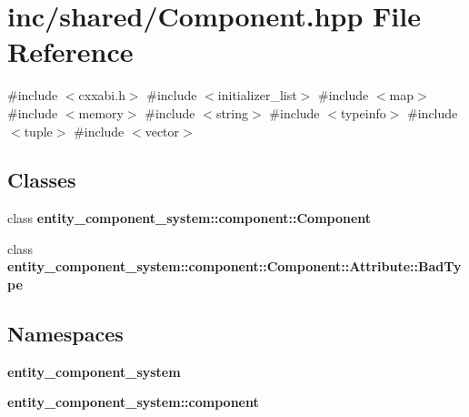\section{inc/shared/\+Component.hpp File Reference}
\label{_component_8hpp}
{\ttfamily \#include $<$cxxabi.\+h$>$}\newline
{\ttfamily \#include $<$initializer\+\_\+list$>$}\newline
{\ttfamily \#include $<$map$>$}\newline
{\ttfamily \#include $<$memory$>$}\newline
{\ttfamily \#include $<$string$>$}\newline
{\ttfamily \#include $<$typeinfo$>$}\newline
{\ttfamily \#include $<$tuple$>$}\newline
{\ttfamily \#include $<$vector$>$}\newline
\subsection*{Classes}
\begin{DoxyCompactItemize}
\item 
class {\bf entity\+\_\+component\+\_\+system\+::component\+::\+Component}
\item 
class {\bf entity\+\_\+component\+\_\+system\+::component\+::\+Component\+::\+Attribute\+::\+Bad\+Type}
\end{DoxyCompactItemize}
\subsection*{Namespaces}
\begin{DoxyCompactItemize}
\item 
 {\bf entity\+\_\+component\+\_\+system}
\item 
 {\bf entity\+\_\+component\+\_\+system\+::component}
\end{DoxyCompactItemize}
